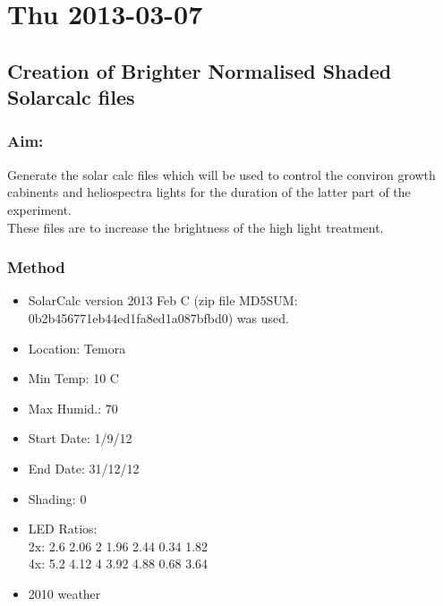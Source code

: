 \documentclass[12pt,a4paper]{book}
\begin{document}
\chapter*{Thu 2013-03-07}
  \section*{Creation of Brighter Normalised Shaded Solarcalc files}
    \subsection*{Aim:}
      Generate the solar calc files which will be used to control the conviron growth cabinents and
      heliospectra lights for the duration of the latter part of the experiment.\\
      These files are to increase the brightness of the high light treatment.\\
    \subsection*{Method}
      \begin{itemize} \itemsep1pt \parskip0pt 
        \item SolarCalc version 2013 Feb C (zip file MD5SUM: 0b2b456771eb44ed1fa8ed1a087bfbd0) was
          used.
        \item Location: Temora
        \item Min Temp: 10 C
        \item Max Humid.: 70
        \item Start Date: 1/9/12
        \item End Date: 31/12/12
        \item Shading: 0
        \item LED Ratios: \\
          2x: 2.6 2.06 2 1.96 2.44 0.34 1.82\\
          4x: 5.2 4.12 4 3.92 4.88 0.68 3.64
        \item 2010 weather
      \end{itemize}
\end{document}
